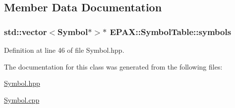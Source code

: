 \subsection{\-Member \-Data \-Documentation}
\hypertarget{class_e_p_a_x_1_1_symbol_table_ae9f0215b62e323d3edecd86fddae58c2}{
\subsubsection[{symbols}]{\setlength{\rightskip}{0pt plus 5cm}std\-::vector$<${\bf \-Symbol}$\ast$$>$$\ast$ {\bf \-E\-P\-A\-X\-::\-Symbol\-Table\-::symbols}}}\label{class_e_p_a_x_1_1_symbol_table_ae9f0215b62e323d3edecd86fddae58c2}


\-Definition at line 46 of file \-Symbol.\-hpp.



\-The documentation for this class was generated from the following files\-:\begin{DoxyCompactItemize}
\item 
\hyperlink{_symbol_8hpp}{\-Symbol.\-hpp}\item 
\hyperlink{_symbol_8cpp}{\-Symbol.\-cpp}\end{DoxyCompactItemize}
